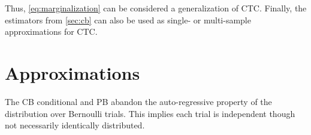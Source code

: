\documentclass{article}
\begin{document}
Thus, \cref{eq:marginalization} can be
considered a generalization of CTC.  Finally, the
estimators from \cref{sec:cb} can also be used as single- or multi-sample
approximations for CTC.



\section{Approximations} \label{sec:appprox}

The CB conditional and PB abandon the auto-regressive property of the
distribution over Bernoulli trials. This implies each trial is independent
though not necessarily identically distributed.
\end{document}
